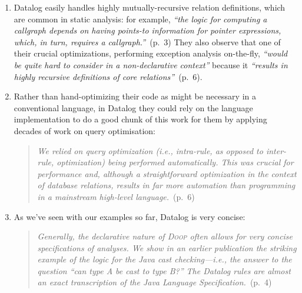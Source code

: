 \begin{enumerate}
\item

  Datalog easily handles highly mutually-recursive relation definitions, which
  are common in static analysis: for example, \emph{``the logic for computing a
    callgraph depends on having points-to information for pointer expressions,
    which, in turn, requires a callgraph.''}~(p.~3) They also observe that one
  of their crucial optimizations, performing exception analysis on-the-fly,
  \emph{``would be quite hard to consider in a non-declarative context''}
  because it \emph{``results in highly recursive definitions of core
    relations''}~(p.~6).

\item Rather than hand-optimizing their code as might be necessary in a
  conventional language, in Datalog they could rely on the language
  implementation to do a good chunk of this work for them by applying decades of
  work on query optimisation:

  \begin{quote}
    \emph{We relied on query optimization (i.e., intra-rule, as opposed to
      inter-rule, optimization) being performed automatically. This was crucial
      for performance and, although a straightforward optimization in the
      context of database relations, results in far more automation than
      programming in a mainstream high-level language.}~(p.~6)
  \end{quote}
  
\item As we've seen with our examples so far, Datalog is very concise:
  
  \begin{quote}
    \emph{Generally, the declarative nature of \textsc{Doop} often allows for
      very concise specifications of analyses. We show in an earlier publication
      the striking example of the logic for the Java cast checking---i.e., the
      answer to the question ``can type A be cast to type B?'' The Datalog rules
      are almost an exact transcription of the Java Language
      Specification.}~(p.~4)
  \end{quote}
\end{enumerate}

